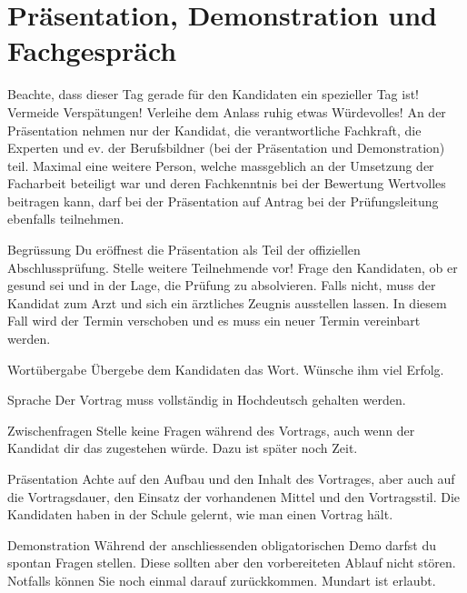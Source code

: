 \chapter{Präsentation, Demonstration und Fachgespräch}
Beachte, dass dieser Tag gerade für den Kandidaten ein spezieller Tag ist! Vermeide Verspätungen! Verleihe dem Anlass ruhig etwas Würdevolles! An der Präsentation nehmen nur der Kandidat, die verantwortliche Fachkraft, die Experten und ev. der Berufsbildner (bei der Präsentation und Demonstration) teil. Maximal eine weitere Person, welche massgeblich an der Umsetzung der Facharbeit beteiligt war und deren Fachkenntnis bei der Bewertung Wertvolles beitragen kann, darf bei der Präsentation auf Antrag bei der Prüfungsleitung ebenfalls teilnehmen.

\begin{taskitem}{Begrüssung}
  Du eröffnest die Präsentation als Teil der offiziellen Abschlussprüfung. Stelle weitere Teilnehmende vor! Frage den Kandidaten, ob er gesund sei und in der Lage, die Prüfung zu absolvieren. Falls nicht, muss der Kandidat zum Arzt und sich ein ärztliches Zeugnis ausstellen lassen. In diesem Fall wird der Termin verschoben und es muss ein neuer Termin vereinbart werden.
\end{taskitem}
\begin{taskitemwithoutcomment}{Wortübergabe}
  Übergebe dem Kandidaten das Wort. Wünsche ihm viel Erfolg.
\end{taskitemwithoutcomment}
\begin{taskitem}{Sprache}
  Der Vortrag muss vollständig in Hochdeutsch gehalten werden.
\end{taskitem}
\begin{taskitemwithoutcomment}{Zwischenfragen}
  Stelle keine Fragen während des Vortrags, auch wenn der Kandidat dir das zugestehen würde. Dazu ist später noch Zeit.
\end{taskitemwithoutcomment}
\begin{taskitem}{Präsentation}
  Achte auf den Aufbau und den Inhalt des Vortrages, aber auch auf die Vortragsdauer, den Einsatz der vorhandenen Mittel und den Vortragsstil. Die Kandidaten haben in der Schule gelernt, wie man einen Vortrag hält.
\end{taskitem}
\begin{taskitem}{Demonstration}
  Während der anschliessenden obligatorischen Demo darfst du spontan Fragen stellen. Diese sollten aber den vorbereiteten Ablauf nicht stören. Notfalls können Sie noch einmal darauf zurückkommen. Mundart ist erlaubt.
\end{taskitem}
